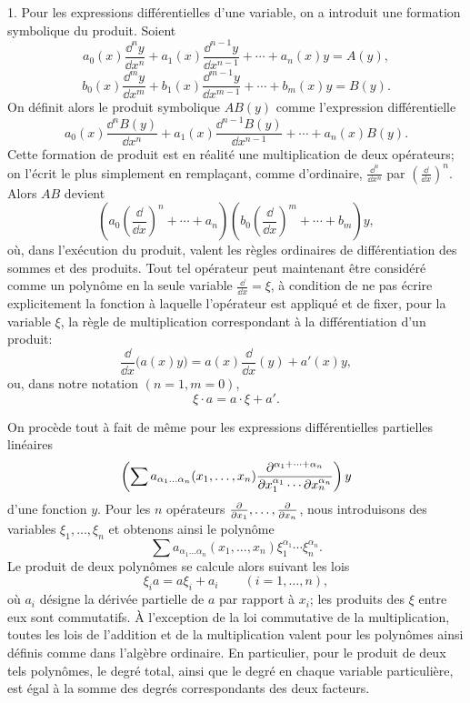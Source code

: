1. Pour les expressions différentielles d'une variable, on a introduit une formation symbolique du produit. Soient
\[
 a_0(x)\frac{\dd^n y}{\dd x^n}+a_1(x)\frac{\dd^{n-1}y}{\dd x^{n-1}}+\cdots+a_n(x)y=A(y),
\]
\[
 b_0(x)\frac{\dd^m y}{\dd x^m}+b_1(x)\frac{\dd^{m-1}y}{\dd x^{m-1}}+\cdots+b_m(x)y=B(y).
\]
On définit alors le produit symbolique $AB(y)$ comme l'expression différentielle
\[
 a_0(x)\frac{\dd^n B(y)}{\dd x^n}+a_1(x)\frac{\dd^{n-1}B(y)}{\dd x^{n-1}}+\cdots+a_n(x)B(y).
\]
Cette formation de produit est en réalité une multiplication de deux opérateurs; on l'écrit le plus simplement en remplaçant, comme d'ordinaire, $\frac{\dd^n}{\dd x^n}$ par $\left(\frac{\dd}{\dd x}\right)^n$. Alors $AB$ devient
\[
 \left(a_0\left(\frac{\dd}{\dd x}\right)^n+\cdots+a_n\right)
 \left(b_0\left(\frac{\dd}{\dd x}\right)^m+\cdots+b_m\right)y,
\]
où, dans l'exécution du produit, valent les règles ordinaires de différentiation des sommes et des produits. Tout tel opérateur peut maintenant être considéré comme un polynôme en la seule variable $\frac{\dd}{\dd x}=\xi$, à condition de ne pas écrire explicitement la fonction à laquelle l'opérateur est appliqué et de fixer, pour la variable $\xi$, la règle de multiplication correspondant à la différentiation d'un produit:
\[
 \frac{\dd}{\dd x}\bigl(a(x)y\bigr)=a(x)\frac{\dd}{\dd x}(y)+a'(x)y,
\]
ou, dans notre notation $(n=1,m=0)$,
\begin{equation}
 \xi\cdot a=a\cdot\xi+a'.
\tag{1}
\end{equation}

On procède tout à fait de même pour les expressions différentielles partielles linéaires
\[
 \left(\sum a_{\alpha_1\ldots\alpha_n}(x_1,\ldots,x_n)
 \frac{\partial^{\alpha_1+\cdots+\alpha_n}}
 {\partial x_1^{\alpha_1}\cdots\partial x_n^{\alpha_n}}\right)y
\]
d'une fonction $y$. Pour les $n$ opérateurs $\frac{\partial}{\partial x_1},\ldots,\frac{\partial}{\partial x_n}$, nous introduisons des variables $\xi_1,\ldots,\xi_n$ et obtenons ainsi le polynôme
\[
 \sum a_{\alpha_1\ldots\alpha_n}(x_1,\ldots,x_n)
 \xi_1^{\alpha_1}\cdots\xi_n^{\alpha_n}.
\]
Le produit de deux polynômes se calcule alors suivant les lois
\begin{equation}
 \xi_i a=a\xi_i+a_i \qquad (i=1,\ldots,n),
\tag{2}
\end{equation}
où $a_i$ désigne la dérivée partielle de $a$ par rapport à $x_i$; les produits des $\xi$ entre eux sont commutatifs. À l'exception de la loi commutative de la multiplication, toutes les lois de l'addition et de la multiplication valent pour les polynômes ainsi définis comme dans l'algèbre ordinaire. En particulier, pour le produit de deux tels polynômes, le degré total, ainsi que le degré en chaque variable particulière, est égal à la somme des degrés correspondants des deux facteurs.

